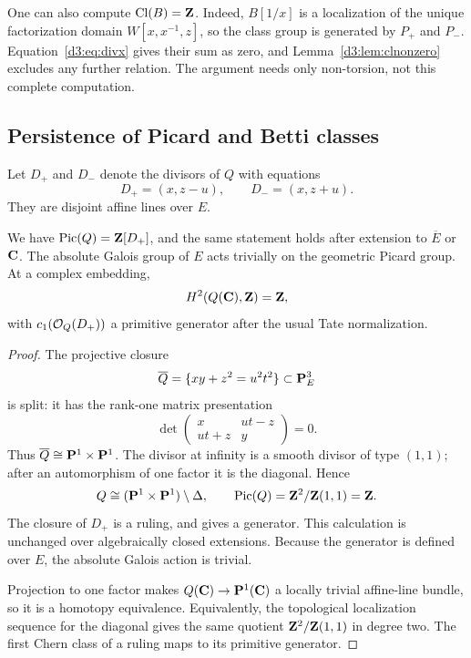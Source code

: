 \begin{remark}
One can also compute $\operatorname{Cl}(B)=\mathbf Z$. Indeed, $B[1/x]$ is a localization of the unique factorization domain $W[x,x^{-1},z]$, so the class group is generated by $P_+$ and $P_-$. Equation~\eqref{d3:eq:divx} gives their sum as zero, and Lemma~\ref{d3:lem:clnonzero} excludes any further relation. The argument needs only non-torsion, not this complete computation.
\end{remark}

\subsection{Persistence of Picard and Betti classes}\label{d3:sec:persistence}

Let $D_+$ and $D_-$ denote the divisors of $Q$ with equations
\[
D_+=(x,z-u),\qquad D_-=(x,z+u).
\]
They are disjoint affine lines over $E$.

\begin{lemma}\label{d3:lem:quadricpic}
We have $\operatorname{Pic}(Q)=\mathbf Z[D_+]$, and the same statement holds after extension to $\overline E$ or $\mathbf C$. The absolute Galois group of $E$ acts trivially on the geometric Picard group. At a complex embedding,
\[
H^2(Q(\mathbf C),\mathbf Z)=\mathbf Z,
\]
with $c_1(\mathcal O_Q(D_+))$ a primitive generator after the usual Tate normalization.
\end{lemma}
\begin{proof}
The projective closure
\[
\overline Q=\{xy+z^2=u^2t^2\}\subset\mathbf P^3_E
\]
is split: it has the rank-one matrix presentation
\[
\det\begin{pmatrix}x&ut-z\\ut+z&y\end{pmatrix}=0.
\]
Thus $\overline Q\cong\mathbf P^1\times\mathbf P^1$. The divisor at infinity is a smooth divisor of type $(1,1)$; after an automorphism of one factor it is the diagonal. Hence
\[
Q\cong (\mathbf P^1\times\mathbf P^1)\setminus\Delta,
\qquad
\operatorname{Pic}(Q)=\mathbf Z^2/\mathbf Z(1,1)=\mathbf Z.
\]
The closure of $D_+$ is a ruling, and gives a generator. This calculation is unchanged over algebraically closed extensions. Because the generator is defined over $E$, the absolute Galois action is trivial.

Projection to one factor makes $Q(\mathbf C)\to\mathbf P^1(\mathbf C)$ a locally trivial affine-line bundle, so it is a homotopy equivalence. Equivalently, the topological localization sequence for the diagonal gives the same quotient $\mathbf Z^2/\mathbf Z(1,1)$ in degree two. The first Chern class of a ruling maps to its primitive generator.
\end{proof}

